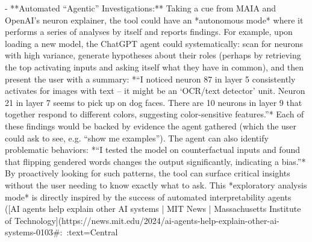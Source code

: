- **Automated “Agentic” Investigations:** Taking a cue from MAIA and OpenAI’s neuron explainer, the tool could have an *autonomous mode* where it performs a series of analyses by itself and reports findings. For example, upon loading a new model, the ChatGPT agent could systematically: scan for neurons with high variance, generate hypotheses about their roles (perhaps by retrieving the top activating inputs and asking itself what they have in common), and then present the user with a summary: *“I noticed neuron 87 in layer 5 consistently activates for images with text – it might be an ‘OCR/text detector’ unit. Neuron 21 in layer 7 seems to pick up on dog faces. There are 10 neurons in layer 9 that together respond to different colors, suggesting color-sensitive features.”* Each of these findings would be backed by evidence the agent gathered (which the user could ask to see, e.g. “show me examples”). The agent can also identify problematic behaviors: *“I tested the model on counterfactual inputs and found that flipping gendered words changes the output significantly, indicating a bias.”* By proactively looking for such patterns, the tool can surface critical insights without the user needing to know exactly what to ask. This *exploratory analysis mode* is directly inspired by the success of automated interpretability agents ([AI agents help explain other AI systems | MIT News | Massachusetts Institute of Technology](https://news.mit.edu/2024/ai-agents-help-explain-other-ai-systems-0103#:~:text=Central%

